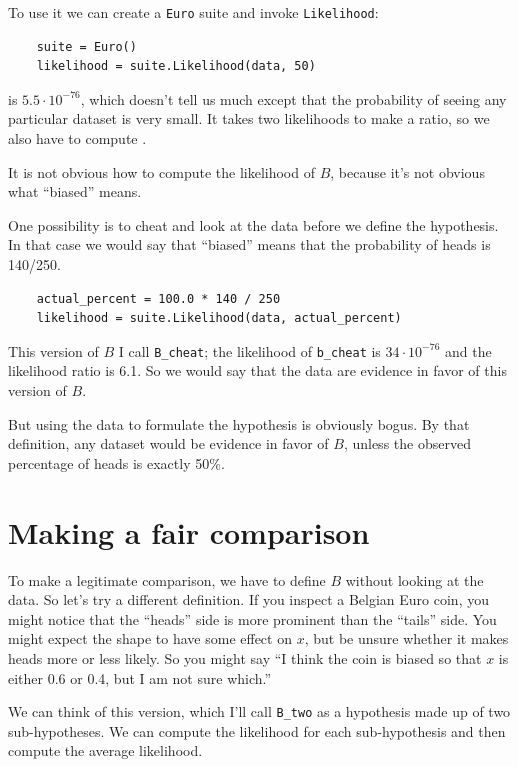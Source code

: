 \documentclass[12pt]{book}
\begin{document}
To use it we can
create a {\tt Euro} suite and invoke
{\tt Likelihood}:

\begin{verbatim}
    suite = Euro()
    likelihood = suite.Likelihood(data, 50)
\end{verbatim}

 is $5.5 \cdot 10^{-76}$, which doesn't tell us much except
that the probability of seeing any particular dataset is very small.
It takes two likelihoods to make a ratio, so we also have to
compute .

It is not obvious how to compute the likelihood of $B$, because
it's not obvious what ``biased'' means.

One possibility is to cheat and look at the data before we define
the hypothesis.  In that case we would say that ``biased'' means that
the probability of heads is 140/250.

\begin{verbatim}
    actual_percent = 100.0 * 140 / 250
    likelihood = suite.Likelihood(data, actual_percent)
\end{verbatim}

This version of $B$ I call \verb"B_cheat"; the likelihood of
\verb"b_cheat" is $34 \cdot 10^{-76}$ and the likelihood ratio is
6.1.  So we would say that the data are evidence in favor of this
version of $B$.

But using the data to formulate the hypothesis
is obviously bogus.  By that definition, any dataset would
be evidence in favor of $B$, unless the observed percentage of heads
is exactly 50\%.

\section{Making a fair comparison}
\label{suitelike}

To make a legitimate comparison, we have to define $B$ without looking
at the data.  So let's try a different definition.  If you inspect
a Belgian Euro coin, you might notice that the ``heads'' side is more
prominent than the ``tails'' side.  You might expect the shape to 
have some effect on
$x$, but be unsure whether it makes heads more or less
likely.  So you might say ``I think the coin is biased so that
$x$ is either 0.6 or 0.4, but I am not sure which.''

We can think of this version, which I'll call \verb"B_two"
as a hypothesis made up of two
sub-hypotheses.  We can compute the likelihood for each
sub-hypothesis and then compute the average likelihood.
\end{document}
